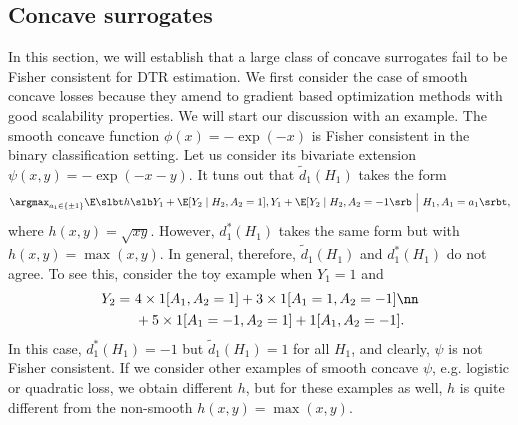\documentclass[preprint] {imsart}
\begin{document}
 \subsection{Concave surrogates}
 \label{sec: failure of smooth concave}
In this section, we will establish that a large class of concave surrogates fail to be Fisher consistent for DTR estimation. 
We first consider the case of smooth concave losses because they amend to gradient based optimization methods with good scalability properties. 
We will start our discussion with an example. The smooth concave function $\phi(x)=-\exp(-x)$ is Fisher consistent in the binary classification setting. Let us consider its bivariate extension $\psi(x,y)=-\exp(-x-y)$. It tuns out that $\tilde d_1(H_1)$ takes the form 
\begin{align}
\label{eq: prelude to surrogate}  
\argmax_{a_1\in\{\pm 1\}}\E\slbt h\slb Y_1+\E[Y_2\mid H_2,A_2=1],Y_1+\E[Y_2\mid H_2,A_2=-1\srb\ \Big |\ H_1, A_1=a_1\srbt,
\end{align}
where $h(x,y)=\sqrt{xy}$. However, $d_1^*(H_1)$ takes the same form but with $h(x,y)=\max(x,y)$. In general, therefore, $\tilde d_1(H_1)$ and $d_1^*(H_1)$ do not agree. To see this, consider the toy example when $Y_1=1$ and 
\begin{align}
\label{def: easy example}
    Y_2=&\ 4\times 1[A_1,A_2=1]+3\times 1[A_1=1,A_2=-1]\nn\\
    &\ +5\times 1[A_1=-1,A_2=1]+1[A_1,A_2=-1].
\end{align}
In this case, $d_1^*(H_1)=-1$ but $\tilde d_1(H_1)=1$ for all $H_1$, and  clearly, $\psi$ is not Fisher consistent. If we consider other examples of smooth concave $\psi$, e.g. logistic or quadratic loss, we obtain different $h$, but for these examples as well, $h$ is  quite different from the non-smooth $h(x,y)=\max(x,y)$. 
\end{document}
